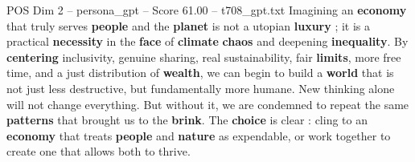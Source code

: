 \begin{textsample}{POS Dim 2 – persona\_gpt – Score 61.00 – t708\_gpt.txt}
Imagining an \textbf{economy} that truly serves \textbf{people} and the \textbf{planet} is not a utopian \textbf{luxury} ; it is a practical \textbf{necessity} in the \textbf{face} of \textbf{climate} \textbf{chaos} and deepening \textbf{inequality}.
By \textbf{centering} inclusivity, genuine sharing, real sustainability, fair \textbf{limits}, more free time, and a just distribution of \textbf{wealth}, we can begin to build a \textbf{world} that is not just less destructive, but fundamentally more humane.
New thinking alone will not change everything.
But without it, we are condemned to repeat the same \textbf{patterns} that brought us to the \textbf{brink}.
The \textbf{choice} is clear : cling to an \textbf{economy} that treats \textbf{people} and \textbf{nature} as expendable, or work together to create one that allows both to thrive.

\end{textsample}
